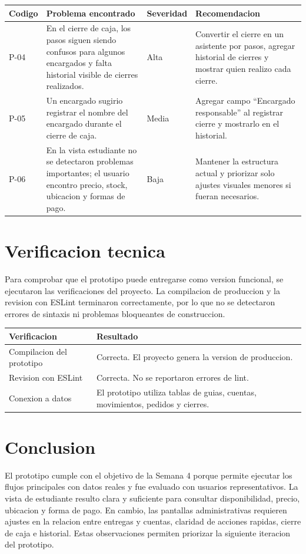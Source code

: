 \documentclass[12pt,letterpaper]{article}
\begin{document}
\begin{center}
\begin{tabularx}{\textwidth}{|B{1.5cm}|Y|B{2.3cm}|Y|}
\hline
Codigo & Problema encontrado & Severidad & Recomendacion \\
\hline
P-04 & En el cierre de caja, los pasos siguen siendo confusos para algunos encargados y falta historial visible de cierres realizados. & Alta & Convertir el cierre en un asistente por pasos, agregar historial de cierres y mostrar quien realizo cada cierre. \\
\hline
P-05 & Un encargado sugirio registrar el nombre del encargado durante el cierre de caja. & Media & Agregar campo ``Encargado responsable'' al registrar cierre y mostrarlo en el historial. \\
\hline
P-06 & En la vista estudiante no se detectaron problemas importantes; el usuario encontro precio, stock, ubicacion y formas de pago. & Baja & Mantener la estructura actual y priorizar solo ajustes visuales menores si fueran necesarios. \\
\hline
\end{tabularx}
\end{center}

\section{Verificacion tecnica}

Para comprobar que el prototipo puede entregarse como version funcional, se ejecutaron las verificaciones del proyecto. La compilacion de produccion y la revision con ESLint terminaron correctamente, por lo que no se detectaron errores de sintaxis ni problemas bloqueantes de construccion.

\begin{center}
\begin{tabularx}{\textwidth}{|B{4cm}|Y|}
\hline
Verificacion & Resultado \\
\hline
Compilacion del prototipo & Correcta. El proyecto genera la version de produccion. \\
\hline
Revision con ESLint & Correcta. No se reportaron errores de lint. \\
\hline
Conexion a datos & El prototipo utiliza tablas de guias, cuentas, movimientos, pedidos y cierres. \\
\hline
\end{tabularx}
\end{center}

\section{Conclusion}

El prototipo cumple con el objetivo de la Semana 4 porque permite ejecutar los flujos principales con datos reales y fue evaluado con usuarios representativos. La vista de estudiante resulto clara y suficiente para consultar disponibilidad, precio, ubicacion y forma de pago. En cambio, las pantallas administrativas requieren ajustes en la relacion entre entregas y cuentas, claridad de acciones rapidas, cierre de caja e historial. Estas observaciones permiten priorizar la siguiente iteracion del prototipo.
\end{document}
